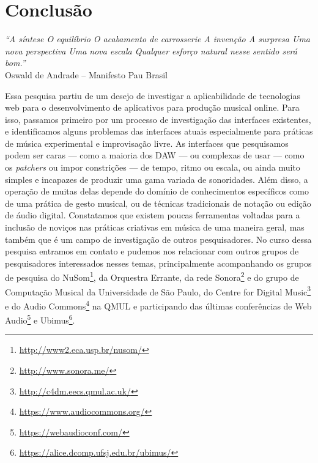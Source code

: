 
\chapter{Conclusão}
\label{ch:conclusao}
\begin{flushright}
\textit{``A síntese
O equilíbrio
O acabamento de carrosserie
A invenção
A surpresa
Uma nova perspectiva
Uma nova escala
Qualquer esforço natural nesse sentido será bom.''} \\
Oswald de Andrade – Manifesto Pau Brasil    
\end{flushright}

Essa pesquisa partiu de um desejo de investigar a aplicabilidade de tecnologias web para o desenvolvimento de aplicativos para produção musical online. Para isso, passamos primeiro por um processo de investigação das interfaces existentes, e identificamos alguns problemas das interfaces atuais especialmente para práticas de música experimental e improvisação livre. As interfaces que pesquisamos podem ser caras --- como a maioria dos DAW --- ou complexas de usar --- como os \emph{patchers} ou impor constrições --- de tempo, ritmo ou escala, ou ainda muito simples e incapazes de produzir uma gama variada de sonoridades. Além disso, a operação de muitas delas depende do domínio de conhecimentos específicos como de uma prática de gesto musical, ou de técnicas tradicionais de notação ou edição de áudio digital. Constatamos que existem poucas ferramentas voltadas para a inclusão de noviços nas práticas criativas em música de uma maneira geral, mas também que é um campo de investigação de outros pesquisadores. No curso dessa pesquisa entramos em contato e pudemos nos relacionar com outros grupos de pesquisadores interessados nesses temas, principalmente acompanhando os grupos de pesquisa do NuSom\footnote{\url{http://www2.eca.usp.br/nusom/}}, da Orquestra Errante, da rede Sonora\footnote{\url{http://www.sonora.me/}} e do grupo de Computação Musical da Universidade de São Paulo, do Centre for Digital Music\footnote{\url{http://c4dm.eecs.qmul.ac.uk/}} e do Audio Commons\footnote{\url{https://www.audiocommons.org/}} na QMUL e participando das últimas conferências de Web Audio\footnote{\url{https://webaudioconf.com/}} e Ubimus\footnote{\url{https://alice.dcomp.ufsj.edu.br/ubimus/}}.

